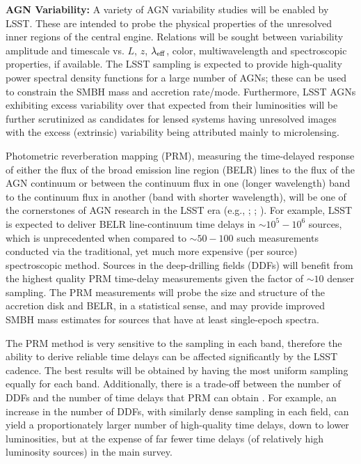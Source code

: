{\bf AGN Variability:} A variety of AGN variability studies will be enabled by LSST. These are intended to probe the physical properties of the unresolved inner regions of the central engine. Relations will be sought between variability amplitude and timescale vs. $L$, $z$, $\lambda_{\rm eff}$, color, multiwavelength and spectroscopic properties, if available. The LSST sampling is expected to provide high-quality power spectral density functions for a large number of AGNs; these can be used to constrain the SMBH mass and accretion rate/mode. Furthermore, LSST AGNs exhibiting excess variability over that expected from their luminosities will be further scrutinized as candidates for lensed systems having unresolved images with the excess (extrinsic) variability being attributed mainly to microlensing.

Photometric reverberation mapping (PRM), measuring the time-delayed response of either the flux of the broad emission line region (BELR) lines to the flux of the AGN continuum or between the continuum flux in one (longer wavelength) band to the continuum flux in another (band with shorter wavelength), will be one of the cornerstones of AGN research in the LSST era
(e.g., \citet{Chelouche2013}; \citet{Chelouche&Zucker2013}; \citet{CheloucheEtal2014}). For example, LSST is expected to deliver BELR line-continuum time delays in $\sim10^5-10^6$ sources, which is unprecedented when compared to $\sim50-100$ such measurements conducted via the traditional, yet much more expensive (per source) spectroscopic method. Sources in the deep-drilling fields (DDFs) will benefit from the highest quality PRM
time-delay measurements given the factor of $\sim10$ denser sampling. The PRM measurements will probe the size and structure of the accretion disk and BELR, in a statistical sense, and may provide improved SMBH mass estimates for sources that have at least single-epoch spectra.

The PRM method is very sensitive to the sampling in each band, therefore the ability to derive reliable time delays can be affected significantly
by the LSST cadence. The best results will be obtained by having the most uniform sampling equally for each band. Additionally, there is
a trade-off between the number of DDFs and the number of time delays that PRM can obtain \citep{CheloucheEtal2014}. For example,
an increase in the number of DDFs, with similarly dense sampling in each field, can yield a proportionately larger number of high-quality time delays,
down to lower luminosities, but at the expense of far fewer time delays (of relatively high luminosity sources) in the main survey.

